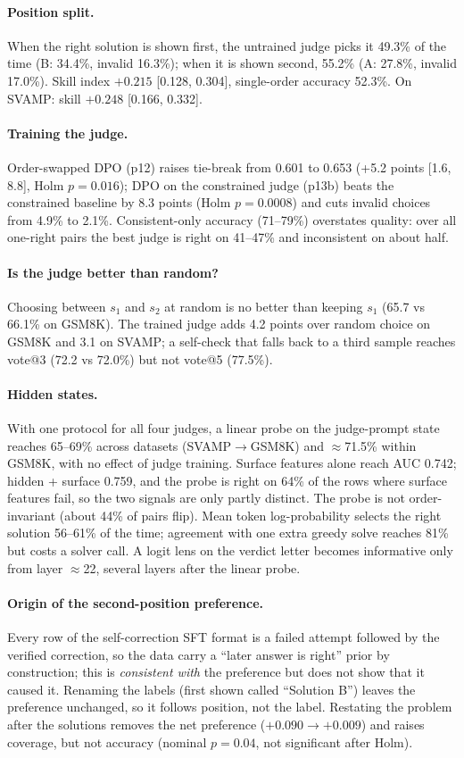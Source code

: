 \documentclass[11pt]{article}
\begin{document}
\paragraph{Position split.} When the right solution is shown first, the untrained judge picks it 49.3\% of the
time (B: 34.4\%, invalid 16.3\%); when it is shown second, 55.2\% (A: 27.8\%, invalid 17.0\%). Skill index
$+0.215$ [0.128, 0.304], single-order accuracy 52.3\%. On SVAMP: skill $+0.248$ [0.166, 0.332].
\paragraph{Training the judge.} Order-swapped DPO (p12) raises tie-break from 0.601 to 0.653 (+5.2 points
[1.6, 8.8], Holm $p=0.016$); DPO on the constrained judge (p13b) beats the constrained baseline by 8.3 points
(Holm $p=0.0008$) and cuts invalid choices from 4.9\% to 2.1\%. Consistent-only accuracy (71--79\%) overstates
quality: over all one-right pairs the best judge is right on 41--47\% and inconsistent on about half.
\paragraph{Is the judge better than random?} Choosing between $s_1$ and $s_2$ at random is no better than
keeping $s_1$ (65.7 vs 66.1\% on GSM8K). The trained judge adds 4.2 points over random choice on GSM8K and 3.1
on SVAMP; a self-check that falls back to a third sample reaches vote@3 (72.2 vs 72.0\%) but not vote@5 (77.5\%).
\paragraph{Hidden states.} With one protocol for all four judges, a linear probe on the judge-prompt state
reaches 65--69\% across datasets (SVAMP$\to$GSM8K) and $\approx$71.5\% within GSM8K, with no effect of judge
training. Surface features alone reach AUC 0.742; hidden + surface 0.759, and the probe is right on 64\% of
the rows where surface features fail, so the two signals are only partly distinct. The probe is not
order-invariant (about 44\% of pairs flip). Mean token log-probability selects the right solution 56--61\% of
the time; agreement with one extra greedy solve reaches 81\% but costs a solver call. A logit lens on the
verdict letter becomes informative only from layer $\approx$22, several layers after the linear probe.
\paragraph{Origin of the second-position preference.} Every row of the self-correction SFT format is a
failed attempt followed by the verified correction, so the data carry a ``later answer is right'' prior by
construction; this is \emph{consistent with} the preference but does not show that it caused it. Renaming
the labels (first shown called ``Solution B'') leaves the preference unchanged, so it follows position, not
the label. Restating the problem after the solutions removes the net preference ($+0.090\to+0.009$) and raises
coverage, but not accuracy (nominal $p=0.04$, not significant after Holm).
\end{document}
